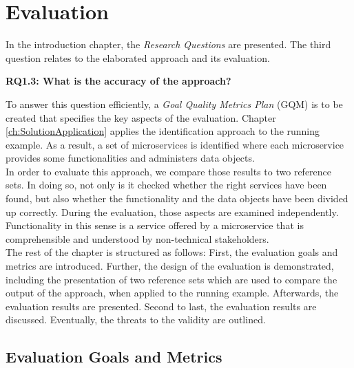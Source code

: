 \chapter{Evaluation}
\label{ch:Evalutation}
In the introduction chapter, the \textit{Research Questions} are presented. The third question relates to the elaborated approach and its evaluation. 


\vspace{0.5cm}
\par
\begingroup
\leftskip=1cm
\rightskip=1cm

\noindent
\textbf{RQ1.3: What is the accuracy of the approach? }

\endgroup
\vspace{0.5cm}

\noindent
To answer this question efficiently, a \textit{Goal Quality Metrics Plan } (GQM) is to be created that specifies the key aspects of the evaluation. 
Chapter \ref{ch:SolutionApplication} applies the identification approach to the running example. As a result, a set of microservices is identified where each microservice provides some functionalities and administers data objects.\\
In order to evaluate this approach, we compare those results to two reference sets. In doing so, not only is it checked whether the right services have been found, but also whether the functionality and the data objects have been divided up correctly. During the evaluation, those aspects are examined independently. Functionality in this sense is a service offered by a microservice that is comprehensible and understood by non-technical stakeholders. \\
The rest of the chapter is structured as follows: First, the evaluation goals and metrics are introduced. Further, the design of the evaluation is demonstrated, including the presentation of two reference sets which are used to compare the output of the approach, when applied to the running example. Afterwards, the evaluation results are presented. Second to last, the evaluation results are discussed. Eventually, the threats to the validity are outlined.


\section{Evaluation Goals and Metrics}

